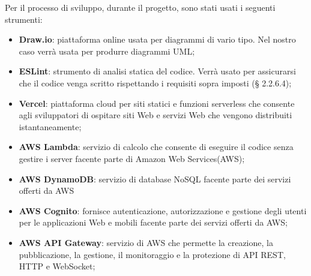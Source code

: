 Per il processo di sviluppo, durante il progetto, sono stati usati i seguenti strumenti:
\begin{itemize}
\item \textbf{Draw.io}: piattaforma online usata per diagrammi di vario tipo. Nel nostro caso verrà usata per produrre diagrammi UML;
\item \textbf{ESLint}: strumento di analisi statica del codice. Verrà usato per assicurarsi che il codice venga scritto rispettando i requisiti sopra imposti (§ 2.2.6.4);
\item \textbf{Vercel}: piattaforma cloud per siti statici e funzioni serverless che consente agli sviluppatori di ospitare siti Web e servizi Web che vengono distribuiti istantaneamente;
\item \textbf{AWS Lambda}: servizio di calcolo che consente di eseguire il codice senza gestire i server facente parte di Amazon Web Services(AWS);
\item \textbf{AWS DynamoDB}: servizio di database NoSQL facente parte dei servizi offerti da AWS
\item \textbf{AWS Cognito}: fornisce autenticazione, autorizzazione e gestione degli utenti per le applicazioni Web e mobili facente parte dei servizi offerti da AWS;
\item \textbf{AWS API Gateway}: servizio di AWS che permette la creazione, la pubblicazione, la gestione, il monitoraggio e la protezione di API REST, HTTP e WebSocket;
\end{itemize} 